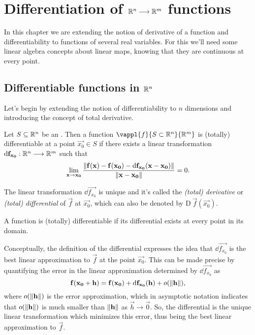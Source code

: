 \chapter{Differentiation of $\Rtn\longrightarrow\R^m$ functions}
\thispagestyle{noheaders}

In this chapter we are extending the notion of derivative of a function and differentiability to functions of several
real variables. For this we'll need some linear algebra concepts about linear maps, knowing that they are continuous at
every point.

\section{Differentiable functions in $\Rtn$}
Let's begin by extending the notion of differentiability to $n$ dimensions and introducing the concept of total derivative.

\begin{defn}\label{def:differentiable-function}
    Let $S\subseteq\Rtn$ be an . Then a function $\vappl{f}{S\subset\Rtn}{\R^m}$ is (totally) differentiable
    at a point $\vec{x_0}\in S$ if there exists a linear transformation $\appl{\dd\vec{f_{x_0}}}{\Rtn}{\R^m}$ such that
    \begin{equation}
        \lim_{\vec{x}\to\vec{x_0}}\frac{\vnorm{\vec{f}(\vec{x}) - \vec{f}(\vec{x_0}) - \dd\vec{f_{x_0}}(\vec{x} 
        - \vec{x_0})}}{\vnorm{\vec{x} - \vec{x_0}}} = 0.
    \end{equation}
\end{defn}

\begin{remark}
    The linear transformation $\dd\vec{f_{x_0}}$ is unique and it's called the \textit{(total) derivative} or 
    \textit{(total) differential} of $\vec{f}$ at $\vec{x_0}$, which can also be denoted by $\textrm{D}\ \vec{f}(\vec{x_0})$.
\end{remark}

\begin{note}
    A function is (totally) differentiable if its differential exists at every point in its domain.
\end{note}

Conceptually, the definition of the differential expresses the idea that $\dd\vec{f_{x_0}}$ is the best linear approximation
to $\vec{f}$ at the point $\vec{x_0}$. This can be made precise by quantifying the error in the linear approximation
determined by $\dd\vec{f_{x_0}}$ as
\begin{equation}
    \mathbf{f}(\mathbf{x_0} + \mathbf{h}) = \mathbf{f}(\mathbf{x_0}) + \dd\mathbf{f_{x_0}}(\mathbf{h}) + o(\left\Vert \mathbf{h} \right\Vert),
\end{equation}
where $o(\left\Vert \mathbf{h} \right\Vert)$ is the error approximation, which in asymptotic notation indicates that $o(\left\Vert \mathbf{h} \right\Vert)$ is
much smaller than $\left\Vert \mathbf{h} \right\Vert$ as $\vec{h}\longrightarrow\vec{0}$. So, the differential is the unique linear transformation 
which minimizes this error, thus being the best linear approximation to $\vec{f}$.

